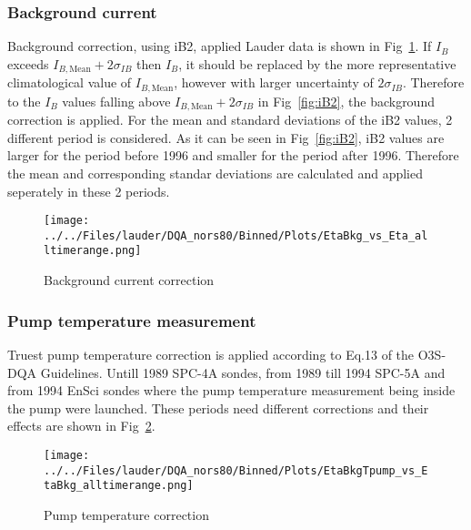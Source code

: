         \subsubsection{Background current}
        Background correction, using iB2, applied Lauder data is shown in Fig~\ref{fig:bkg}. If $I_B$ exceeds $I_{B,\text{Mean}}+2\sigma_{IB}$ then $I_B$, it
should be replaced by the more representative climatological value of $I_{B,\text{Mean}}$, however with
larger uncertainty of $2\sigma_{IB}$.
Therefore to the $I_B$ values falling above $I_{B,\text{Mean}}+2\sigma_{IB}$ in Fig~\ref{fig:iB2}, the background correction is applied. For the mean and standard deviations
of the iB2 values, 2 different period is considered. As it can be seen in Fig~\ref{fig:iB2}, iB2 values are larger for the period before 1996 and smaller for the period after
1996. Therefore the mean and corresponding standar deviations are calculated and applied seperately in these 2 periods.
%
%
                \begin{figure}
        \centering
\texttt{[image: ../../Files/lauder/DQA\_nors80/Binned/Plots/EtaBkg\_vs\_Eta\_alltimerange.png]}
    \caption{Background current correction}
            \label{fig:bkg}
    \end{figure}
%
            \subsubsection{Pump temperature measurement}
 Truest pump temperature correction is applied according to Eq.13 of the O3S-DQA Guidelines. Untill 1989 SPC-4A sondes, from 1989 till 1994
 SPC-5A and from 1994 EnSci sondes where the pump temperature measurement being inside the pump  were launched.
 These periods need different corrections and their effects are shown in Fig~\ref{fig:tpump}.

%
                    \begin{figure}
        \centering
\texttt{[image: ../../Files/lauder/DQA\_nors80/Binned/Plots/EtaBkgTpump\_vs\_EtaBkg\_alltimerange.png]}
    \caption{Pump temperature correction }
            \label{fig:tpump}
    \end{figure}
%
